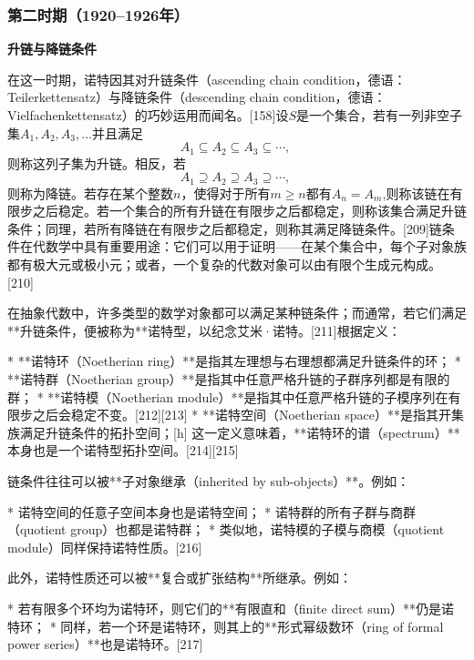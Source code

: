 \subsubsection{第二时期（1920–1926年）}
\textbf{升链与降链条件}

在这一时期，诺特因其对升链条件（ascending chain condition，德语：Teilerkettensatz）与降链条件（descending chain condition，德语：Vielfachenkettensatz）的巧妙运用而闻名。[158]设$S$是一个集合，若有一列非空子集$A_1, A_2, A_3, \ldots$并且满足
$$
A_1 \subseteq A_2 \subseteq A_3 \subseteq \cdots,~
$$
则称这列子集为升链。相反，若
$$
A_1 \supseteq A_2 \supseteq A_3 \supseteq \cdots,~
$$
则称为降链。若存在某个整数$n$，使得对于所有$m \ge n$都有$A_n = A_m$,则称该链在有限步之后稳定。若一个集合的所有升链在有限步之后都稳定，则称该集合满足升链条件；同理，若所有降链在有限步之后都稳定，则称其满足降链条件。[209]链条件在代数学中具有重要用途：它们可以用于证明——在某个集合中，每个子对象族都有极大元或极小元；或者，一个复杂的代数对象可以由有限个生成元构成。[210]

在抽象代数中，许多类型的数学对象都可以满足某种链条件；而通常，若它们满足**升链条件，便被称为**诺特型，以纪念艾米·诺特。[211]根据定义：

* **诺特环（Noetherian ring）**是指其左理想与右理想都满足升链条件的环；
* **诺特群（Noetherian group）**是指其中任意严格升链的子群序列都是有限的群；
* **诺特模（Noetherian module）**是指其中任意严格升链的子模序列在有限步之后会稳定不变。[212][213]
* **诺特空间（Noetherian space）**是指其开集族满足升链条件的拓扑空间；[h] 这一定义意味着，**诺特环的谱（spectrum）**本身也是一个诺特型拓扑空间。[214][215]

链条件往往可以被**子对象继承（inherited by sub-objects）**。例如：

* 诺特空间的任意子空间本身也是诺特空间；
* 诺特群的所有子群与商群（quotient group）也都是诺特群；
* 类似地，诺特模的子模与商模（quotient module）同样保持诺特性质。[216]

此外，诺特性质还可以被**复合或扩张结构**所继承。例如：

* 若有限多个环均为诺特环，则它们的**有限直和（finite direct sum）**仍是诺特环；
* 同样，若一个环是诺特环，则其上的**形式幂级数环（ring of formal power series）**也是诺特环。[217]
